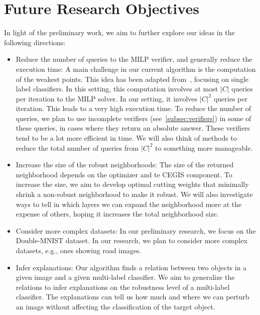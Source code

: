 

\section{Future Research Objectives}
In light of the preliminary work, we aim to further explore our ideas in the following directions:
\begin{itemize}
    \item Reduce the number of queries to the MILP verifier, and generally reduce the execution time:
    A main challenge in our current algorithm is the computation of the weakest points.
    This idea has been adapted from~\cite{MARVEL}, focusing on single label classifiers.
    In this setting, this computation involves at most $|C|$ queries per iteration to the MILP solver.
    In our setting, it involves  $|C|^2$ queries per iteration.
    This leads to a very high execution time.
    To reduce the number of queries, we plan to use incomplete verifiers (see~\ref{subsec:verifiers}) in some of these queries, in cases where they return an absolute answer.
    These verifiers tend to be a lot more efficient in time.
    We will also think of methods to reduce the total number of queries from $|C|^2$ to something more manageable.
    \item Increase the size of the robust neighborhoods: The size of the returned neighborhood depends on the optimizer and te CEGIS component.
    To increase the size, we aim to develop optimal cutting weights that minimally shrink a non-robust neighborhood to make it robust.
    We will also investigate ways to tell in which layers we can expand the neighborhood more at the expense of others, hoping it increases the total neighborhood size.
\item Consider more complex datasets: In our preliminary research, we focus on the Double-MNIST dataset. In our research, we plan to consider more complex datasets, e.g., ones showing road images. 
    \item Infer explanations: Our algorithm finds a relation between two objects in a given image and a given multi-label classifier.
    We aim to generalize the relations to infer explanations on the robustness level of a multi-label classifier. The explanations can tell us how much and where we can perturb an image without affecting the classification of the target object. 
\end{itemize}
